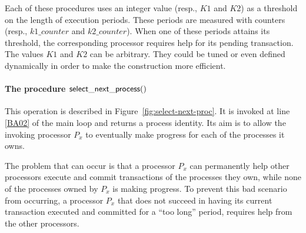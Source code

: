 Each of these  procedures  uses an  integer value (resp., $K1$ and $K2$) 
as  a threshold  on the length of execution periods. These periods 
are measured with counters (resp., $k1\_counter$ and $k2\_counter$). 
When one of these periods attains its threshold, the corresponding 
processor requires help for its pending  transaction. 
%
The values $K1$ and $K2$ can be arbitrary. They could be tuned 
or even defined dynamically in order to make the construction more efficient. 

\paragraph{The procedure  ${\sf select\_next\_process}()$}
This operation is described in Figure~\ref{fig:select-next-proc}.
It is invoked at line \ref{BA02} of the main loop and 
returns a process identity.  Its aim is to allow the invoking processor 
$P_x$  to  eventually make  progress for each of the processes it owns. 

The problem that can  occur is that a processor  $P_x$ 
can permanently help other processors execute and commit
transactions of the processes they own, while none of the processes 
owned by $P_x$ is  making progress.  To prevent this bad scenario  
from occurring, a  processor $P_x$ that does not  succeed in having  
its current transaction executed and committed for  a ``too long''
period,  requires help from the other processors. 







